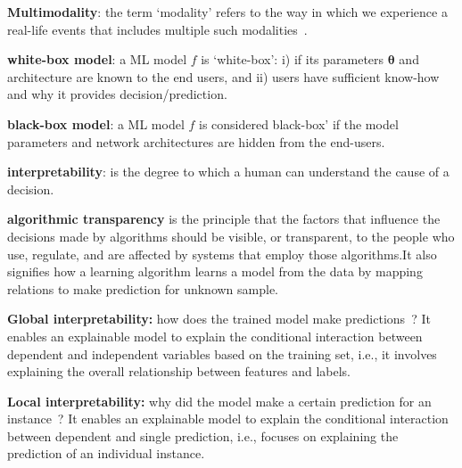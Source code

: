 \begin{definition}       
    \textbf{Multimodality}: the term `modality' refers to the way in which we experience a real-life events that includes multiple such modalities~\cite{mmsurvey}.
\end{definition}  
        
\begin{definition}
    \textbf{white-box model}: a ML model $f$ is `white-box': i) if its parameters $\boldsymbol{\theta}$ and architecture are known to the end users, and ii) users have sufficient know-how and why it provides decision/prediction.  
\end{definition}

\begin{definition}
    \textbf{black-box model}: a ML model $f$ is considered black-box' if the model parameters and network architectures are hidden from the end-users. 
\end{definition}

\begin{definition}
    \textbf{interpretability}: is the degree to which a human can understand the cause of a decision.
\end{definition}

\begin{definition}
    {\textbf{algorithmic transparency}} is the principle that the factors that influence the decisions made by algorithms should be visible, or transparent, to the people who use, regulate, and are affected by systems that employ those algorithms.It also signifies how a learning algorithm learns a model from the data by mapping relations to make prediction for unknown sample.
\end{definition}

\begin{definition}
    \textbf{Global interpretability:} how does the trained model make predictions~\cite{molnar2019interpretable}? It enables an explainable model to explain the conditional interaction between dependent and independent variables based on the training set, i.e., it involves explaining the overall relationship between features and labels.
\end{definition}

\begin{definition}
    \textbf{Local interpretability:} why did the model make a certain prediction for an instance~\cite{molnar2019interpretable}? It enables an explainable model to explain the conditional interaction between dependent and single prediction, i.e., focuses on explaining the prediction of an individual instance. 
\end{definition}

